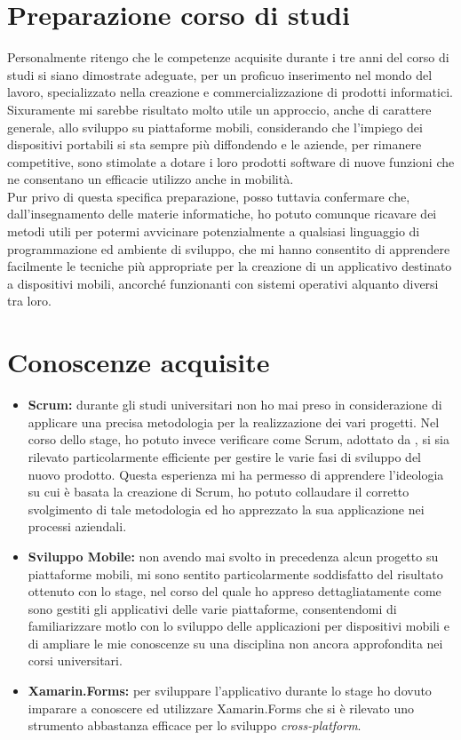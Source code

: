 \section{Preparazione corso di studi}
Personalmente ritengo che le competenze acquisite durante i tre anni del corso di studi si siano dimostrate adeguate, per un proficuo inserimento nel mondo del lavoro, specializzato nella creazione e commercializzazione di prodotti informatici.
\\
Sixuramente mi sarebbe risultato molto utile un approccio, anche di carattere generale, allo sviluppo su piattaforme mobili, considerando che l'impiego dei dispositivi portabili si sta sempre più diffondendo e le aziende, per rimanere competitive, sono stimolate a dotare i loro prodotti software di nuove funzioni che ne consentano un efficacie utilizzo anche in mobilità.
\\
Pur privo di questa specifica preparazione, posso tuttavia confermare che, dall'insegnamento delle materie informatiche, ho potuto comunque ricavare dei metodi utili per potermi avvicinare potenzialmente a qualsiasi linguaggio di programmazione ed ambiente di sviluppo, che mi hanno consentito di apprendere facilmente le tecniche più appropriate per la creazione di un applicativo destinato a dispositivi mobili, ancorché funzionanti con sistemi operativi alquanto diversi tra loro.

\section{Conoscenze acquisite}
\begin{itemize}
	\item \textbf{Scrum:} durante gli studi universitari non ho mai preso in considerazione di applicare una precisa metodologia per la realizzazione dei vari progetti. Nel corso dello stage, ho potuto invece verificare come Scrum, adottato da \asi, si sia rilevato particolarmente efficiente per gestire le varie fasi di sviluppo del nuovo prodotto. Questa esperienza mi ha permesso di apprendere l'ideologia su cui è basata la creazione di Scrum, ho potuto collaudare il corretto svolgimento di tale metodologia ed ho apprezzato la sua applicazione nei processi aziendali.
	\item \textbf{Sviluppo Mobile:} non avendo mai svolto in precedenza alcun progetto su piattaforme mobili, mi sono sentito particolarmente soddisfatto del risultato ottenuto con lo stage, nel corso del quale ho appreso dettagliatamente come sono gestiti gli applicativi delle varie piattaforme, consentendomi di familiarizzare motlo con lo sviluppo delle applicazioni per dispositivi mobili e di ampliare le mie conoscenze su una disciplina non ancora approfondita nei corsi universitari.
	\item \textbf{Xamarin.Forms:} per sviluppare l'applicativo durante lo stage ho dovuto imparare a conoscere ed utilizzare Xamarin.Forms che si è rilevato uno strumento abbastanza efficace per lo sviluppo \textit{cross-platform}.
\end{itemize}